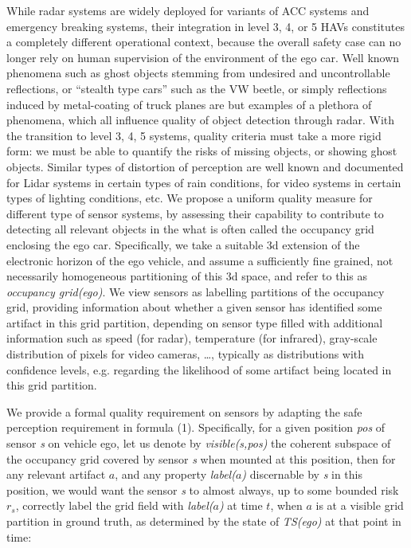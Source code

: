 While radar systems are widely deployed for variants of ACC systems and emergency breaking systems, their integration in level 3, 4, or 5 HAVs constitutes a completely different operational context, because the overall safety case can no longer rely on human supervision of the environment of the ego car. Well known phenomena such as ghost objects stemming from undesired and uncontrollable reflections, or \enquote{stealth type cars} such as the VW beetle, or simply reflections induced by metal-coating of truck planes are but examples of a plethora of phenomena, which all influence quality of object detection through radar. With the transition to level 3, 4, 5 systems, quality criteria must take a more rigid form: we must be able to quantify the risks of missing objects, or showing ghost objects. Similar types of distortion of perception are well known and documented for Lidar systems in certain types of rain conditions, for video systems in certain types of lighting conditions, etc. We propose a uniform quality measure for different type of sensor systems, by assessing their capability to contribute to detecting all relevant objects in the what is often called the occupancy grid enclosing the ego car. Specifically, we take a suitable 3d extension of the electronic horizon of the ego vehicle, and assume a sufficiently fine grained, not necessarily homogeneous partitioning of this 3d space, and refer to this as \emph{occupancy grid(ego)}. We view sensors as labelling partitions of the occupancy grid, providing information about whether a given sensor has identified some artifact in this grid partition, depending on sensor type filled with additional information such as speed (for radar), temperature (for infrared), gray-scale distribution of pixels for video cameras, \ldots, typically as distributions with confidence levels, e.g. regarding the likelihood of some artifact being located in this grid partition. 

We provide a formal quality requirement on sensors by adapting the safe perception requirement in formula (1). Specifically, for a given position \textit{pos}  of sensor  \textit{s}  on vehicle ego, let us denote by \textit{visible(s,pos)} the coherent subspace of the occupancy grid covered by sensor \textit{s} when mounted at this position, then for any relevant artifact  $a$, and any property  \textit{label($a$)} discernable by  \textit{s}  in this position, we would want the sensor \textit{s} to almost always, up to some bounded risk $r_s$, correctly label the grid field with \textit{label($a$)} at time $t$, when $a$ is at a visible grid partition in ground truth, as determined by the state of \textit{TS(ego)} at that point in time:

